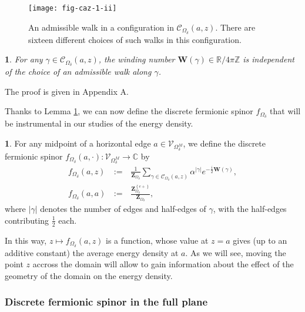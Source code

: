 \documentclass[oneside,english]{amsart}
\numberwithin{equation}{section}
\numberwithin{figure}{section}
\theoremstyle{plain}
\theoremstyle{plain}
\theoremstyle{plain}
\theoremstyle{plain}
\theoremstyle{plain}
\newtheorem{lem}[thm]{\protect\lemmaname}
\theoremstyle{definition}
\newtheorem{defn}[thm]{\protect\definitionname}
\theoremstyle{remark}
\providecommand{\definitionname}{Definition}
\providecommand{\lemmaname}{Lemma}
\begin{document}
\begin{figure}
\texttt{[image: fig-caz-1-ii]}\caption{\label{fig:configuration-walk}An admissible walk in a configuration
in $\mathcal{C}_{\Omega_{\delta}}\left(a,z\right)$. There are sixteen
different choices of such walks in this configuration. }
\end{figure}

\begin{lem}
\label{lem:well-definedness}For any $\gamma\in\mathcal{C}_{\Omega_{\delta}}\left(a,z\right)$,
the winding number $\mathbf{W}\left(\gamma\right)\in\mathbb{R}/4\pi\mathbb{Z}$
is independent of the choice of an admissible walk along $\gamma$.
\end{lem}
The proof is given in Appendix A.

Thanks to Lemma \ref{lem:well-definedness}, we can now define the
discrete fermionic spinor $f_{\Omega_{\delta}}$ that will be instrumental
in our studies of the energy density.
\begin{defn}
\label{def:disc-hol-spin-bded-domain}For any midpoint of a horizontal
edge $a\in\mathcal{V}_{\Omega_{\delta}^{M}}$, we define the discrete
fermionic spinor $f_{\Omega_{\delta}}\left(a,\cdot\right):\mathcal{V}_{\Omega_{\delta}^{M}}\to\mathbb{C}$
by
\begin{eqnarray*}
f_{\Omega_{\delta}}\left(a,z\right) & \,:=\, & \frac{1}{\mathbf{Z}_{\Omega_{\delta}}}\sum_{\gamma\in\mathcal{C}_{\Omega_{\delta}}\left(a,z\right)}\alpha^{\left|\gamma\right|}e^{-\frac{i}{2}\mathbf{W}\left(\gamma\right)},\\
f_{\Omega_{\delta}}\left(a,a\right) & \,:=\, & \frac{\mathbf{Z}_{\Omega_{\delta}}^{\left\{ e+\right\} }}{\mathbf{Z}_{\Omega_{\delta}}},
\end{eqnarray*}
where $\left|\gamma\right|$ denotes the number of edges and half-edges
of $\gamma$, with the half-edges contributing $\frac{1}{2}$ each.
\end{defn}
In this way, $z\mapsto f_{\Omega_{\delta}}\left(a,z\right)$ is a
function, whose value at $z=a$ gives (up to an additive constant)
the average energy density at $a$. As we will see, moving the point
$z$ accross the domain will allow to gain information about the effect
of the geometry of the domain on the energy density.


\subsubsection{\label{sub:disc-hol-spin-full-plane}Discrete fermionic spinor in
the full plane}
\end{document}

